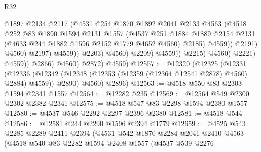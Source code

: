 \begin{lexlean}{R32}
\begin{coremodule}
                                          @1897
                                          @2134
                                          @2117
                                          (@4531
                                            @254
                                            @1870
                                            @1892
                                            @2041
                                            @2133
                                            @4563
                                            (@4518
                                              @252
                                              @83
                                              @1890
                                              @1594
                                              @2131
                                              @1557
                                              (@4537
                                                @251
                                                @1884
                                                @1889
                                                @2154
                                                @2131
                                                (@4633 @244 @1882 @1596 @2152 @1779 @4652 @4560)
                                                @2185)
                                              @4559))
                                          @2191)
                                        @4560)
                                      @2197)
                                    @4559))
                                @2203)
                              @4560)
                            @2209)
                          @4559))
                      @2215)
                    @4560)
                  @2221)
                @4559))
            @2866)
          @4560)
        @2872)
      @4559)
@12557 := @12320
    (@12325
      (@12331
        (@12336 (@12342 (@12348 (@12353 (@12359 (@12364 @12541 @2878) @4560) @2884) @4559)) @2890)
        @4560)
      @2896)
@12563 := @4518 @550 @83 @2303 @1594 @2341 @1557
@12564 := @12282 @235
@12569 := @12564 @549 @2300 @2302 @2382 @2341
@12575 := @4518 @547 @83 @2298 @1594 @2380 @1557
@12580 := @4537 @546 @2292 @2297 @2396 @2380
@12581 := @4518 @544
@12586 := @12581 @244 @2290 @1596 @2394 @1779
@12659 := @4525
    @543
    @2285
    @2289
    @2411
    @2394
    (@4531
      @542
      @1870
      @2284
      @2041
      @2410
      @4563
      (@4518
        @540
        @83
        @2282
        @1594
        @2408
        @1557
        (@4537
          @539
          @2276

\end{coremodule}
\end{lexlean}

